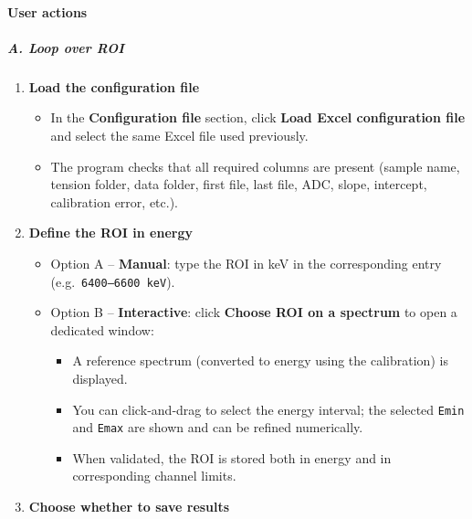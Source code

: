 \hypertarget{user-actions-2}{%
\paragraph{User actions}\label{user-actions-2}}

\hypertarget{a.-loop-over-roi}{%
\subparagraph{A. Loop over ROI}\label{a.-loop-over-roi}}

\begin{enumerate}
\def\labelenumi{\arabic{enumi}.}
\tightlist
\item
  \textbf{Load the configuration file}

  \begin{itemize}
  \tightlist
  \item
    In the \textbf{Configuration file} section, click \textbf{Load Excel
    configuration file} and select the same Excel file used
    previously.\\
  \item
    The program checks that all required columns are present (sample
    name, tension folder, data folder, first file, last file, ADC,
    slope, intercept, calibration error, etc.).
  \end{itemize}
\item
  \textbf{Define the ROI in energy}

  \begin{itemize}
  \tightlist
  \item
    Option A -- \textbf{Manual}: type the ROI in keV in the
    corresponding entry (e.g.~\texttt{6400–6600\ keV}).\\
  \item
    Option B -- \textbf{Interactive}: click \textbf{Choose ROI on a
    spectrum} to open a dedicated window:

    \begin{itemize}
    \tightlist
    \item
      A reference spectrum (converted to energy using the calibration)
      is displayed.\\
    \item
      You can click‑and‑drag to select the energy interval; the selected
      \texttt{Emin} and \texttt{Emax} are shown and can be refined
      numerically.\\
    \item
      When validated, the ROI is stored both in energy and in
      corresponding channel limits.
    \end{itemize}
  \end{itemize}
\item
  \textbf{Choose whether to save results}


\end{enumerate}

